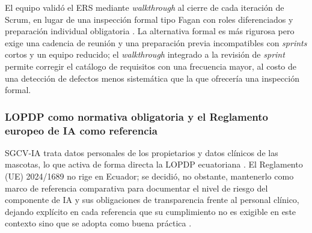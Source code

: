El equipo validó el ERS mediante \emph{walkthrough} al cierre de cada iteración de Scrum, en lugar de
una inspección formal tipo Fagan con roles diferenciados y preparación individual obligatoria
\cite{fagan1976}. La alternativa formal es más rigurosa pero exige una cadencia de reunión y una
preparación previa incompatibles con \emph{sprints} cortos y un equipo reducido; el
\emph{walkthrough} integrado a la revisión de \emph{sprint} permite corregir el catálogo de
requisitos con una frecuencia mayor, al costo de una detección de defectos menos sistemática que la
que ofrecería una inspección formal.
 
\subsubsection*{LOPDP como normativa obligatoria y el Reglamento europeo de IA como referencia}
 
SGCV-IA trata datos personales de los propietarios y datos clínicos de las mascotas, lo que activa de
forma directa la LOPDP ecuatoriana \cite{lopdp2021}. El Reglamento (UE) 2024/1689 no rige en Ecuador;
se decidió, no obstante, mantenerlo como marco de referencia comparativa para documentar el nivel de
riesgo del componente de IA y sus obligaciones de transparencia frente al personal clínico, dejando
explícito en cada referencia que su cumplimiento no es exigible en este contexto sino que se adopta
como buena práctica \cite{aiact2024}.
